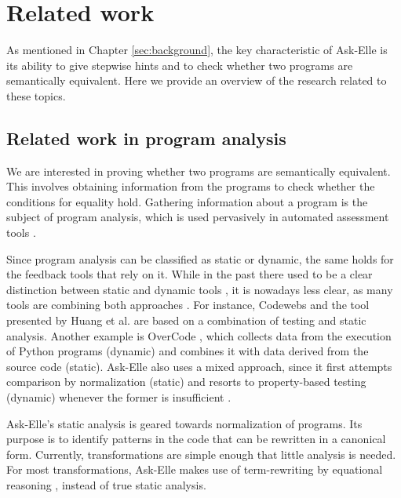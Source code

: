 \chapter{Related work}
\label{sec:related-work}

As mentioned in Chapter \ref{sec:background}, the key characteristic of Ask-Elle is its ability to give stepwise hints and to check whether two programs are semantically equivalent. Here we provide an overview of the research related to these topics.

\section{Related work in program analysis}

We are interested in proving whether two programs are semantically equivalent. This involves obtaining information from the programs to check whether the conditions for equality hold. Gathering information about a program is the subject of program analysis, which is used pervasively in automated assessment tools \cite{2016feedbackreview}.

Since program analysis can be classified as static or dynamic, the same holds for the feedback tools that rely on it. While in the past there used to be a clear distinction between static and dynamic tools \cite{2005alasurvey}, it is nowadays less clear, as many tools are combining both approaches \cite{2016feedbackreview}. For instance, Codewebs \cite{2014codewebs} and the tool presented by Huang et al. \cite{2013huang} are based on a combination of testing and static analysis. Another example is OverCode \cite{2015overcode}, which collects data from the execution of Python programs (dynamic) and combines it with data derived from the source code (static). Ask-Elle also uses a mixed approach, since it first attempts comparison by normalization (static) and resorts to property-based testing (dynamic) whenever the former is insufficient \cite{2010askelle}.

Ask-Elle's static analysis is geared towards normalization of programs. Its purpose is to identify patterns in the code that can be rewritten in a canonical form. Currently, transformations are simple enough that little analysis is needed. For most transformations, Ask-Elle makes use of term-rewriting by equational reasoning \cite{1998termrewriting}, instead of true static analysis.


